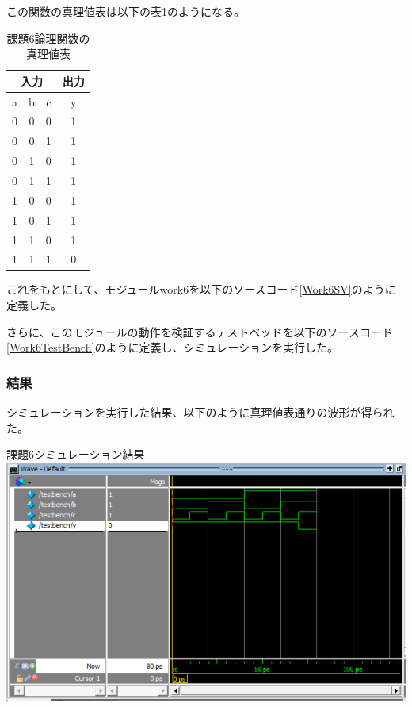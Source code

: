 \documentclass[a4paper]{jarticle}
\begin{document}
この関数の真理値表は以下の表\ref{Work6TruthTable}のようになる。
\begin{table}[ht]
	\begin{center}
		\caption{課題6論理関数の真理値表}
		\label{Work6TruthTable}
		\begin{tabular}{|c|c|c||c|}
			\hline
			\multicolumn{3}{|c|}{入力} & \multicolumn{1}{|c|}{出力}\\	\hline\hline
			a	&b	&c	&y\\	\hline\hline
			0	&0	&0	&1\\	\hline
			0	&0	&1	&1\\	\hline
			0	&1	&0	&1\\	\hline
			0	&1	&1	&1\\	\hline
			1	&0	&0	&1\\	\hline
			1	&0	&1	&1\\	\hline
			1	&1	&0	&1\\	\hline
			1	&1	&1	&0\\	\hline
		\end{tabular}
	\end{center}
\end{table}
これをもとにして、モジュールwork6を以下のソースコード\ref{Work6SV}のように定義した。

さらに、このモジュールの動作を検証するテストベッドを以下のソースコード\ref{Work6TestBench}のように定義し、シミュレーションを実行した。

\subsubsection{結果}
シミュレーションを実行した結果、以下のように真理値表通りの波形が得られた。
\begin{center}
	課題6シミュレーション結果
	\includegraphics[width=15cm]{6-m.PNG}
\end{center}
\end{document}
